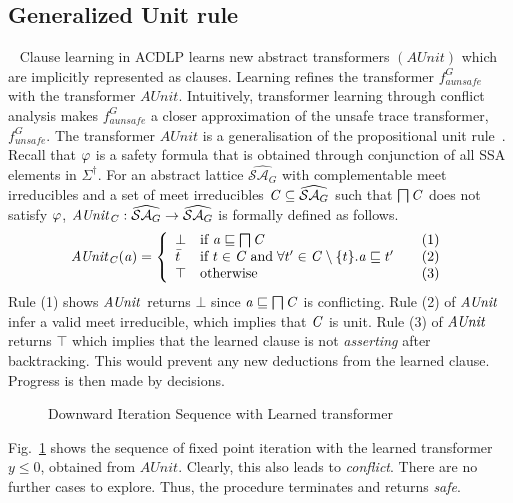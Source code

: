 \subsection{Generalized Unit rule}~\label{learning}
%
Clause learning in ACDLP learns new abstract transformers $(AUnit)$ 
which are implicitly represented as clauses.  
Learning refines the transformer $f_{aunsafe}^G$ with the transformer $AUnit$. 
Intuitively, transformer learning through conflict analysis makes $f_{aunsafe}^G$ a 
closer approximation of the unsafe trace transformer, $f_{unsafe}^{G}$.  
%
The transformer $AUnit$ is a generalisation of the propositional unit rule~\cite{cdcl}.  
Recall that $\varphi$ is a safety formula that is obtained through 
conjunction of all SSA elements in $\Sigma^{\dagger}$. 
For an abstract lattice $\widehat{\mathcal{SA}_{G}}$ with
complementable meet irreducibles and a set of meet irreducibles $\mathit{C}
\subseteq \widehat{\mathcal{SA}_{G}}$ such that $\bigsqcap
\mathit{C}$ does not satisfy $\varphi$, $\mathit{AUnit}_{\mathit{C}}:
\widehat{\mathcal{SA}_G} \rightarrow \widehat{\mathcal{SA}_G}$ 
is formally defined as follows.
\[ \aunit_\conflictset(\absval) =
 \left\{\begin{array}{l@{\quad}l@{\qquad}l}
  \bot       & \text{if } \absval \sqsubseteq \bigsqcap \conflictset & (1)\\
  \bar{t}    & \text{if } t \in \conflictset \; \text{and} \; \forall t' \in \conflictset
  \setminus \{t\}. \absval  \sqsubseteq t' & (2) \\
  \top & \text{otherwise} & (3) \\
 \end{array}\right.
\]
%
Rule (1) shows $\mathit{AUnit}$ returns $\bot$ since 
$\mathit{a} \sqsubseteq \bigsqcap \mathit{C}$ is conflicting.  
Rule (2) of $\mathit{AUnit}$ infer a valid meet irreducible, 
which implies that $\mathit{C}$ is unit.  Rule (3) of  
$\mathit{AUnit}$ returns $\top$ which implies that the learned clause is not 
{\em asserting} after backtracking.  This would prevent any new 
deductions from the learned clause. Progress is then made by decisions. 
%
\begin{figure}[htbp]
\centering
\vspace*{-0.2cm}
\caption{Downward Iteration Sequence with Learned transformer \label{learning}}
\end{figure}
%
\begin{example}
Fig.~\ref{learning} shows the sequence of fixed point iteration with the learned
transformer $y \leq 0$, obtained from $AUnit$.  Clearly, this also leads to 
\emph{conflict}. There are no further cases to explore. Thus, the procedure 
terminates and returns \emph{safe}.
\end{example}
%
%

